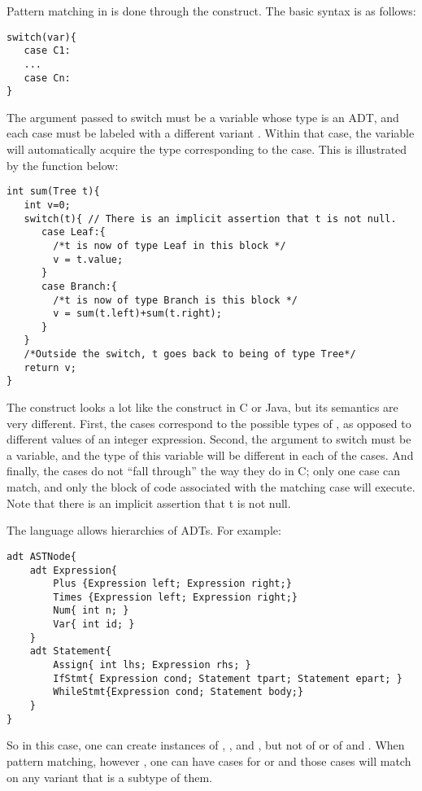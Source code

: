 Pattern matching in \Sk{} is done through the  construct. The basic syntax is as follows:
\begin{lstlisting}
switch(var){
   case C1: 
   ...
   case Cn:
}
\end{lstlisting}
The argument  passed to switch must be a variable whose type is an ADT, and each case must be labeled with a different variant . Within that case, the variable  will automatically acquire the type corresponding to the case. This is illustrated by the function below: 



\begin{lstlisting}
int sum(Tree t){
   int v=0;
   switch(t){ // There is an implicit assertion that t is not null.
      case Leaf:{
        /*t is now of type Leaf in this block */
        v = t.value;
      }
      case Branch:{
        /*t is now of type Branch is this block */
        v = sum(t.left)+sum(t.right);
      }
   }        
   /*Outside the switch, t goes back to being of type Tree*/
   return v;
}
\end{lstlisting}
The  construct looks a lot like the  construct in C or Java, but its semantics are very different. First, the cases correspond to the possible types of , as opposed to different values of an integer expression. Second, the argument to switch must be a variable, and the type of this variable will be different in each of the cases. And finally, the cases do not ``fall through'' the way they do in C; only one case can match, and only the block of code associated with the matching case will execute. Note that there is an implicit assertion that t is not null.

The language allows hierarchies of ADTs. For example:
\begin{lstlisting}
adt ASTNode{
    adt Expression{
        Plus {Expression left; Expression right;}
        Times {Expression left; Expression right;}
        Num{ int n; }
        Var{ int id; }
    }
    adt Statement{
        Assign{ int lhs; Expression rhs; }
        IfStmt{ Expression cond; Statement tpart; Statement epart; }
        WhileStmt{Expression cond; Statement body;}
    }    
}
\end{lstlisting}
So in this case, one can create instances of , ,  and , but not of  or of  and . When pattern matching, however , one can have cases for  or  and those cases will match on any variant that is a subtype of them. 

